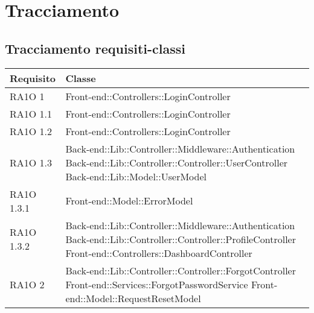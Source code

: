 \section{Tracciamento}
\subsection{Tracciamento requisiti-classi}
\begin{center}
      \bgroup
      \def\arraystretch{1.8}
      \begin{longtable}{ | p{3cm} | p{11cm} | }
    \hline
    
      \cellcolor[gray]{0.9} \textbf{Requisito} & \cellcolor[gray]{0.9} \textbf{Classe} \\ \hline
      
	RA1O 1 & Front-end::Controllers::LoginController \newline  \\ \hline 
	RA1O 1.1 & Front-end::Controllers::LoginController \newline  \\ \hline 
	RA1O 1.2 & Front-end::Controllers::LoginController \newline  \\ \hline      

	RA1O 1.3 & Back-end::Lib::Controller::Middleware::Authentication  \newline Back-end::Lib::Controller::Controller::UserController \newline Back-end::Lib::Model::UserModel \\ \hline  
    
    RA1O 1.3.1 & Front-end::Model::ErrorModel \newline  \\ \hline 
           
    RA1O 1.3.2 & Back-end::Lib::Controller::Middleware::Authentication \newline
        			Back-end::Lib::Controller::Controller::ProfileController \newline
        			Front-end::Controllers::DashboardController \newline  \\ \hline 
        				
        				     
    RA1O 2 & Back-end::Lib::Controller::Controller::ForgotController \newline
    			Front-end::Services::ForgotPasswordService \newline
    			Front-end::Model::RequestResetModel  \newline  \\ \hline   
    			   

\end{longtable}
\end{center}
